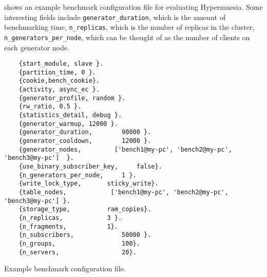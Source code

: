  shows an example benchmark configuration file for
evaluating Hypermnesia. Some interesting fields include 
\verb|generator_duration|, which is the amount of benchmarking time, 
\verb|n_replicas|, which is the number of replicas in the cluster,
\verb|n_generators_per_node|, which can be thought of as the number of clients
on each generator node.


\begin{listing}[htp]
  \begin{verbatim}
    {start_module, slave }.
    {partition_time, 0 }.
    {cookie,bench_cookie}.
    {activity, async_ec }.
    {generator_profile, random }.
    {rw_ratio, 0.5 }.
    {statistics_detail, debug }.
    {generator_warmup, 12000 }.
    {generator_duration,  		90000 }.
    {generator_cooldown,  		12000 }.
    {generator_nodes,         ['bench1@my-pc', 'bench2@my-pc', 'bench3@my-pc']	}.
    {use_binary_subscriber_key, 	false}.
    {n_generators_per_node, 	1 }.
    {write_lock_type,		sticky_write}.
    {table_nodes,         	 ['bench1@my-pc', 'bench2@my-pc', 'bench3@my-pc'] }.
    {storage_type, 			ram_copies}.
    {n_replicas,   			3 }.
    {n_fragments,  			1}.
    {n_subscribers,		        50000 }.
    {n_groups,     		        100}.
    {n_servers,    		        20}.
  \end{verbatim}
  \label{lst:bench config file}
  \caption{Example benchmark configuration file.}
  
\end{listing}
